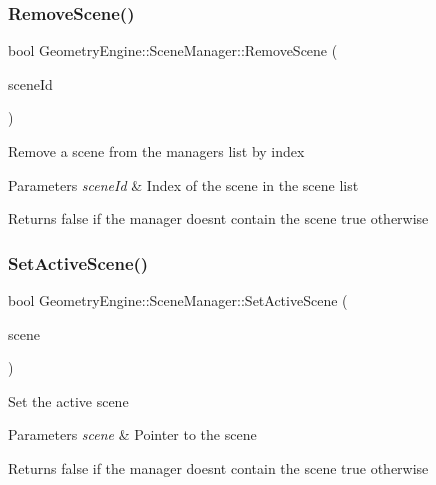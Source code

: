\subsubsection{\texorpdfstring{RemoveScene()}{RemoveScene()}\hspace{0.1cm}{\footnotesize\ttfamily [2/2]}}
{\footnotesize\ttfamily bool Geometry\+Engine\+::\+Scene\+Manager\+::\+Remove\+Scene (\begin{DoxyParamCaption}\item[{unsigned int}]{scene\+Id }\end{DoxyParamCaption})}

Remove a scene from the manager\textquotesingle{}s list by index 
\begin{DoxyParams}{Parameters}
{\em scene\+Id} & Index of the scene in the scene list \\
\hline
\end{DoxyParams}
\begin{DoxyReturn}{Returns}
false if the manager doesn\textquotesingle{}t contain the scene true otherwise 
\end{DoxyReturn}
\mbox{\label{class_geometry_engine_1_1_scene_manager_a0d493622807bb55d8e33a313ca61a3db}} 
\subsubsection{\texorpdfstring{SetActiveScene()}{SetActiveScene()}\hspace{0.1cm}{\footnotesize\ttfamily [1/2]}}
{\footnotesize\ttfamily bool Geometry\+Engine\+::\+Scene\+Manager\+::\+Set\+Active\+Scene (\begin{DoxyParamCaption}\item[{\mbox{\hyperlink{class_geometry_engine_1_1_geometry_scene_1_1_geometry_scene}{Geometry\+Scene\+::\+Geometry\+Scene}} $\ast$}]{scene }\end{DoxyParamCaption})}

Set the active scene 
\begin{DoxyParams}{Parameters}
{\em scene} & Pointer to the scene \\
\hline
\end{DoxyParams}
\begin{DoxyReturn}{Returns}
false if the manager doesn\textquotesingle{}t contain the scene true otherwise 
\end{DoxyReturn}
\mbox{\label{class_geometry_engine_1_1_scene_manager_a2a188fd362d750afeca3aa79102fc9de}} 
